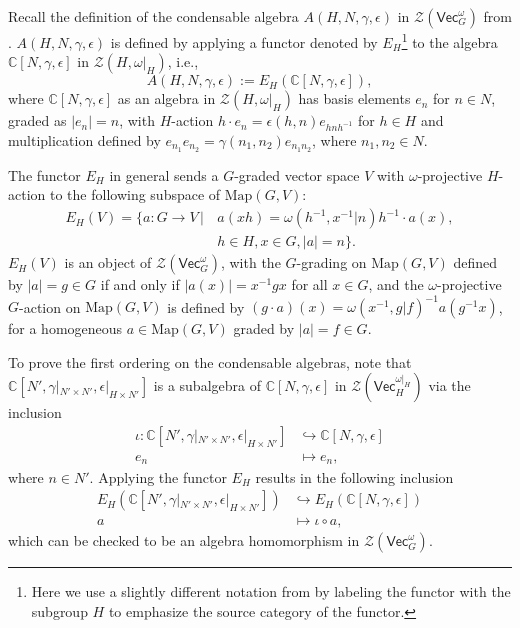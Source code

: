 \documentclass[aps,twocolumn,prx,floatfix,preprintnumbers, nofootinbib,10pt]{revtex4-2}
\numberwithin{equation}{section}
\theoremstyle{definition}
\newcommand{\nn}{\nonumber}
\newcommand{\bC}{{\mathbb C}}
\newcommand{\cZ}{\mathcal{Z}}
\newcommand{\Vect}{\mathsf{Vec}}
\begin{document}
Recall the definition of the condensable algebra $A(H,N,\gamma, \epsilon)$ in $\cZ(\Vect_G^{\omega})$ from \cite{davydov2017lagrangian}. $A(H,N,\gamma, \epsilon)$ is defined by applying a functor denoted by $E_{H}$\footnote{Here we use a slightly different notation from \cite{davydov2017lagrangian} by labeling the functor with the subgroup $H$ to emphasize the source category of the functor.} to the algebra $\bC[N,\gamma,\epsilon]$ in $\cZ(H,\omega|_H)$, i.e.,
\begin{equation}
\label{eqn:induce-cond-alg}
    A(H,N,\gamma, \epsilon):=E_H(\bC[N,\gamma,\epsilon]),
\end{equation}
where $\bC[N,\gamma,\epsilon]$ as an algebra in $\cZ(H,\omega|_H)$ has basis elements $e_n$ for $n\in N$, graded as $|e_n|=n$, with $H$-action $h\cdot e_n=\epsilon(h,n)e_{hnh^{-1}}$ for $h\in H$ and multiplication defined by $e_{n_1} e_{n_2} = \gamma(n_1,n_2) e_{n_1 n_2}$, where $n_1, n_2\in N$. 

The functor $E_H$ in general sends a $G$-graded vector space $V$ with $\omega$-projective $H$-action to the following subspace of $\text{Map}(G,V)$:
\begin{align} \label{eqn:defn_transfer_functor}
    E_H(V) = \{ a: G \rightarrow V\,|\, & a(xh)=\omega(h^{-1},x^{-1}|n) h^{-1}\cdot a(x), \nn\\
    & h\in H, x\in G, |a|=n \}.
\end{align}
$E_H(V)$ is an object of $\cZ(\Vect_G^{\omega})$, with the $G$-grading on $\text{Map}(G,V)$ defined by $|a|=g\in G$ if and only if $|a(x)|=x^{-1}gx$ for all $x\in G$, and the $\omega$-projective $G$-action on $\text{Map}(G,V)$ is defined by $(g\cdot a)(x)=\omega(x^{-1},g|f)^{-1}a(g^{-1}x)$, for a homogeneous $a\in \text{Map}(G,V)$ graded by $|a|=f\in G$. 

To prove the first ordering on the condensable algebras, note that $\bC[N',\gamma|_{N'\times N'}, \epsilon|_{H\times N'}]$ is a subalgebra of $\bC[N,\gamma,\epsilon]$ in $\cZ(\Vect_{H}^{\omega|_{H}})$ via the inclusion
\begin{align}
    \iota: \bC[N',\gamma|_{N'\times N'}, \epsilon|_{H\times N'}] & \hookrightarrow \bC[N,\gamma,\epsilon] \nn\\
    e_n & \mapsto e_n,
\end{align}
where $n\in N'$. Applying the functor $E_H$ results in the following inclusion 
\begin{align}
    E_H(\bC[N',\gamma|_{N'\times N'}, \epsilon|_{H\times N'}]) & \hookrightarrow E_H(\bC[N,\gamma,\epsilon]) \nn\\
    a & \mapsto \iota \circ a,
\end{align}
which can be checked to be an algebra homomorphism in $\cZ(\Vect_G^{\omega})$.
\end{document}
